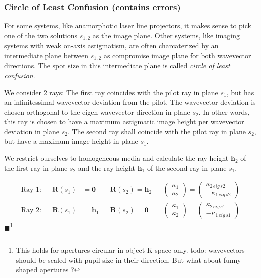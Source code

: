 \documentclass[12pt,a4paper,twoside,openright,BCOR10mm,headsepline,titlepage,abstracton,chapterprefix,final]{scrreprt}
\newcommand\Vector[1]{{\mathbf{#1}}}
\newcommand{\remark}[1]{{\color{red}$\blacksquare$}\footnote{{\color{red}#1}}}
\begin{document}
\subsubsection{Circle of Least Confusion (contains errors)}
For some systems, like anamorphotic laser line projectors, it makes sense to pick one of the two solutions $s_{1,2}$ as the image plane.
Other systems, like imaging systems with weak on-axis astigmatism, 
are often charcaterized by an intermediate plane between $s_{1,2}$ as compromise image plane for both wavevector directions.
The spot size in this intermediate plane is called \emph{circle of least confusion}.

We consider 2 rays: 
The first ray coincides with the pilot ray in plane $s_1$, but has an infinitessimal wavevector deviation from the pilot.
The wavevector deviation is chosen orthogonal to the eigen-wavevector direction in plane $s_2$.
In other words, this ray is chosen to have a maximum astigmatic image height per wavevector deviation in plane $s_2$.
The second ray shall coincide with the pilot ray in plane $s_2$, but have a maximum image height in plane $s_1$.

We restrict ourselves to homogeneous media and calculate the ray height $\Vector{h}_2$ of the first ray in plane $s_2$ 
and the ray height $\Vector{h}_1$ of the second ray in plane $s_1$.

\begin{align*}
\textrm{Ray 1:} && \Vector{R}(s_1) &= \Vector{0} && \Vector{R}(s_2) = \Vector{h}_2 && \begin{pmatrix} \kappa_1\\\kappa_2 \end{pmatrix} = \begin{pmatrix} \kappa_{2\,eig\,s2} \\ - \kappa_{1\,eig\,s2} \end{pmatrix}
\\
\textrm{Ray 2:} && \Vector{R}(s_1) &= \Vector{h}_1 && \Vector{R}(s_2) = \Vector{0} && \begin{pmatrix} \kappa_1\\\kappa_2 \end{pmatrix} = \begin{pmatrix} \kappa_{2\,eig\,s1} \\ - \kappa_{1\,eig\,s1} \end{pmatrix}
\end{align*}
\remark{This holds for apertures circular in object K-space only. todo: wavevectors should be scaled with pupil size in their direction. But what about funny shaped apertures ?}
\end{document}
